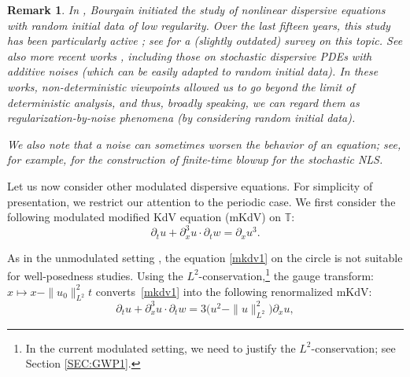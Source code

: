 \documentclass[letterpaper, 11pt,  reqno]{amsart}
\newtheorem{remark}[theorem]{Remark}
\newcommand{\1}{\hspace{0.5mm}\text{I}\hspace{0.5mm}}
\newcommand{\noi}{\noindent}
\newcommand{\T}{\mathbb{T}}
\newcommand{\dx}{\partial_x}
\newcommand{\dt}{\partial_t}
\numberwithin{equation}{section}
\numberwithin{theorem}{section}
\begin{document}
\begin{remark}\label{REM:random1}
\rm
In \cite{BO94, BO96}, Bourgain initiated the study 
of nonlinear dispersive equations with random initial data of low regularity.
Over the last fifteen years, 
this study has been particularly active
\cite{BO96, BT08, CO, BT3, BOP2, Poc, OP};
see \cite{BOP4} for a (slightly outdated) survey on this topic.
See also more recent works
\cite{GKO2, DNY2, OOT1, Bring, OOT2, BDNY}, including those
on stochastic dispersive PDEs with additive noises
(which can be easily adapted to random initial data).
In these works, 
non-deterministic viewpoints
allowed us to go beyond the limit of deterministic analysis, 
and thus, 
broadly speaking, 
we can  regard them as 
regularization-by-noise phenomena
(by considering random initial data). 




We also note that 
a  noise can sometimes  worsen the behavior of an equation; 
see, 
for example, 
\cite{de_bouard_effect_2002, de_bouard_blow-up_2005}
for the construction of 
finite-time blowup  for the stochastic NLS.



\end{remark}














\medskip



Let us now consider other modulated dispersive equations.
For simplicity of presentation, 
we restrict our attention to the periodic case.
We first consider the following
  modulated
 modified KdV equation (mKdV) on $\T$:
\begin{equation}
\label{mkdv1}
\dt u+ \dx^3 u \cdot \dt w=\dx u^3.
\end{equation}



\noi
As in the unmodulated setting \cite{BO93}, 
the equation \eqref{mkdv1} on the circle is not suitable 
for well-posedness studies.
Using the $L^2$-conservation,\footnote{In the current modulated setting, 
we need to justify the $L^2$-conservation; see Section \ref{SEC:GWP1}.} 
the gauge transform: $x \mapsto x -\|u_0\|_{L^2}^2 t$
converts~\eqref{mkdv1}
into the  following renormalized mKdV:
\begin{equation}
\label{mkdv2}
\dt u+   \dx^3 u \cdot \dt w=3   \big(u^2- \|u\|_{L^2}^2\big)\dx u, 
\end{equation}
\end{document}
